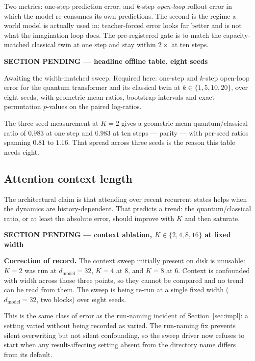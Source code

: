 \documentclass[11pt]{article}
\newif\ifdraft
\newenvironment{pendingbox}[1]
  {\par\vspace{3pt}\noindent
   \begin{lrbox}{\pendbox}\begin{minipage}{0.93\linewidth}\small
   \textcolor{PendFG}{\textbf{SECTION PENDING --- #1}}\par\vspace{3pt}
   \color{PendFG}}
  {\end{minipage}\end{lrbox}%
   \ifdraft\fcolorbox{PendFG}{PendBG}{\usebox{\pendbox}}\fi
   \par\vspace{4pt}}
\begin{document}
Two metrics: one-step prediction error, and $k$-step \emph{open-loop}
rollout error in which the model re-consumes its own predictions. The
second is the regime a world model is actually used in; teacher-forced
error looks far better and is not what the imagination loop does. The
pre-registered gate is to match the capacity-matched classical twin at
one step and stay within $2\times$ at ten steps.

\begin{pendingbox}{headline offline table, eight seeds}
Awaiting the width-matched sweep. Required here: one-step and $k$-step
open-loop error for the quantum transformer and its classical twin at
$k \in \{1, 5, 10, 20\}$, over eight seeds, with geometric-mean ratios,
bootstrap intervals and exact permutation $p$-values on the paired
log-ratios.

The three-seed measurement at $K = 2$ gives a geometric-mean
quantum/classical ratio of $0.983$ at one step and $0.983$ at ten
steps --- parity --- with per-seed ratios spanning $0.81$ to $1.16$.
That spread across three seeds is the reason this table needs eight.
\end{pendingbox}

\subsection{Attention context length}
The architectural claim is that attending over recent recurrent states
helps when the dynamics are history-dependent. That predicts a trend:
the quantum/classical ratio, or at least the absolute error, should
improve with $K$ and then saturate.

\begin{pendingbox}{context ablation, $K \in \{2,4,8,16\}$ at fixed width}
\textbf{Correction of record.} The context sweep initially present on
disk is unusable: $K = 2$ was run at $d_{\text{model}} = 32$, $K = 4$ at
$8$, and $K = 8$ at $6$. Context is confounded with width across those
three points, so they cannot be compared and no trend can be read from
them. The sweep is being re-run at a single fixed width
($d_{\text{model}} = 32$, two blocks) over eight seeds.

This is the same class of error as the run-naming incident of
Section~\ref{sec:impl}: a setting varied without being recorded as
varied. The run-naming fix prevents silent overwriting but not silent
confounding, so the sweep driver now refuses to start when any
result-affecting setting absent from the directory name differs from its
default.
\end{pendingbox}
\end{document}
